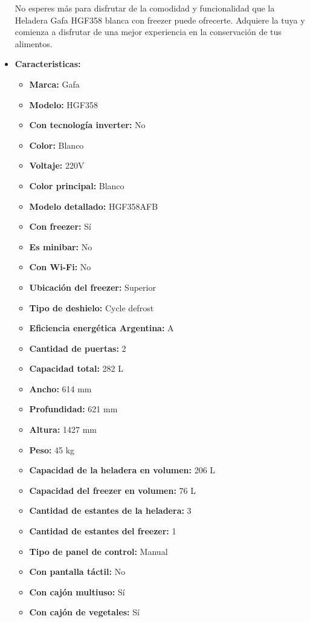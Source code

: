 \documentclass{article}
\begin{document}
\begin{adjustwidth}{2em}{}
\begin{itemize}
No esperes más para disfrutar de la comodidad y funcionalidad que la Heladera Gafa HGF358 blanca con freezer puede ofrecerte. Adquiere la tuya y comienza a disfrutar de una mejor experiencia en la conservación de tus alimentos.
        \item \textbf{Caracteristicas:} 
        \begin{itemize}
            \item \textbf {Marca:} Gafa
    \item \textbf {Modelo:} HGF358
    \item \textbf {Con tecnología inverter:} No
    \item \textbf {Color:} Blanco
    \item \textbf {Voltaje:} 220V
    \item \textbf {Color principal:} Blanco
    \item \textbf {Modelo detallado:} HGF358AFB
    \item \textbf {Con freezer:} Sí
    \item \textbf {Es minibar:} No
    \item \textbf {Con Wi-Fi:} No
    \item \textbf {Ubicación del freezer:} Superior
    \item \textbf {Tipo de deshielo:} Cycle defrost
    \item \textbf {Eficiencia energética Argentina:} A
    \item \textbf {Cantidad de puertas:} 2
    \item \textbf {Capacidad total:} 282 L
    \item \textbf {Ancho:} 614 mm
    \item \textbf {Profundidad:} 621 mm
    \item \textbf {Altura:} 1427 mm
    \item \textbf {Peso:} 45 kg
    \item \textbf {Capacidad de la heladera en volumen:} 206 L
    \item \textbf {Capacidad del freezer en volumen:} 76 L
    \item \textbf {Cantidad de estantes de la heladera:} 3
    \item \textbf {Cantidad de estantes del freezer:} 1
    \item \textbf {Tipo de panel de control:} Manual
    \item \textbf {Con pantalla táctil:} No
    \item \textbf {Con cajón multiuso:} Sí
    \item \textbf {Con cajón de vegetales:} Sí

\end{itemize}
\end{itemize}
\end{adjustwidth}
\end{document}
